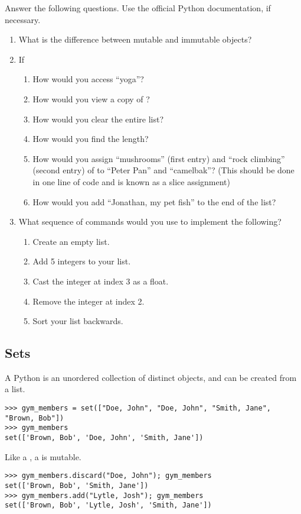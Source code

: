 \begin{problem}
Answer the following questions. Use the official Python documentation, if necessary.

\begin{enumerate}
\item What is the difference between mutable and immutable objects?
\item If 
\begin{enumerate}
\item How would you access ``yoga''? 
\item How would you view a copy of ?
\item How would you clear the entire list? 
\item How would you find the length? 
\item How would you assign ``mushrooms'' (first entry) and ``rock climbing'' (second entry) 
of  to ``Peter Pan'' and ``camelbak''? 
(This should be done in one line of code and is known as a slice assignment)
\item How would you add ``Jonathan, my pet fish'' to the end of the list?
\end{enumerate}
\item What sequence of commands would you use to implement the following?
\begin{enumerate}
\item Create an empty list. 
\item Add 5 integers to your list. 
\item Cast the integer at index 3 as a float.
\item Remove the integer at index 2. 
\item Sort your list backwards.
\end{enumerate}
\end{enumerate}
\end{problem}


\subsection*{Sets}
A Python  is an unordered collection of distinct objects, and can be created from a list.
\begin{lstlisting}
>>> gym_members = set(["Doe, John", "Doe, John", "Smith, Jane", "Brown, Bob"])
>>> gym_members
set(['Brown, Bob', 'Doe, John', 'Smith, Jane'])
\end{lstlisting}
Like a , a  is mutable. 
\begin{lstlisting}
>>> gym_members.discard("Doe, John"); gym_members
set(['Brown, Bob', 'Smith, Jane'])
>>> gym_members.add("Lytle, Josh"); gym_members
set(['Brown, Bob', 'Lytle, Josh', 'Smith, Jane'])
\end{lstlisting}

